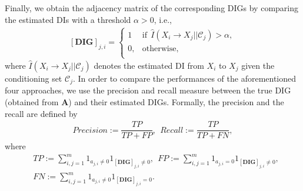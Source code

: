 Finally, we obtain the adjacency matrix of the corresponding DIGs by comparing the estimated DIs with a threshold $\alpha>0$, i.e., 
\begin{align}\label{eq:m}
    [\textbf{DIG}]_{j,i}=\left\{
\begin{array}{ll}
      1  & \text{if}\ \ \widehat{I}(X_i\rightarrow X_j||\mathcal{C}_j)>\alpha, \\
      0,  & \text{otherwise}, \\
\end{array} 
\right.
\end{align}
where $\widehat{I}(X_i\rightarrow X_j||\mathcal{C}_j)$ denotes the estimated DI from $X_i$ to $X_j$ given the conditioning set $\mathcal{C}_j$. 
In order to compare the performances of the aforementioned four approaches, we use the precision and recall measure between the true DIG (obtained from $\textbf{A}$) and their estimated DIGs. 
Formally, the precision and the recall are defined by
\begin{align*}
    Precision:= \dfrac{TP}{TP+FP}, \ \ Recall:= \dfrac{TP}{TP+FN},
\end{align*}
where 
\begin{align*}
    & TP := \sum_{i,j=1}^m 1_{a_{j,i} \neq 0}1_{ [\textbf{DIG}]_{j,i} \neq 0}, \ \ FP := \sum_{i,j=1}^m 1_{a_{j,i} = 0}1_{ [\textbf{DIG}]_{j,i} \neq 0},\\
    & FN := \sum_{i,j=1}^m 1_{a_{j,i} \neq 0}1_{ [\textbf{DIG}]_{j,i} = 0}.
\end{align*}

    
